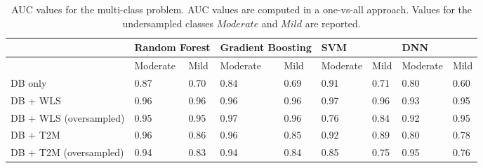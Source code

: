 \documentclass{article}
\begin{document}
\begin{table}[h]
\centering
\caption{AUC values for the multi-class problem. AUC values are computed in a one-vs-all approach. Values for the undersampled classes $Moderate$ and $Mild$ are reported.}
\label{aucmulti}
\begin{tabular}{|p{2cm}||p{1cm}p{1cm}|p{1cm}p{1cm}|p{1cm}p{1cm}|p{1cm}p{1cm}|}
\hline
                        & \multicolumn{2}{l|}{Random Forest} & \multicolumn{2}{l|}{Gradient Boosting} & \multicolumn{2}{l|}{SVM} & \multicolumn{2}{l|}{DNN} \\ \hline
                        & Moderate           & Mild          & Moderate             & Mild            & Moderate      & Mild     & Moderate      & Mild     \\ \hline
DB only                 & 0.87               & 0.70          & 0.84                 & 0.69            &               0.91 & 0.71         & 0.80          & 0.60     \\ \hline
DB + WLS                & 0.96               & 0.96          & 0.96                 & 0.96            &  0.97             & 0.96         & 0.93          & 0.95     \\ \hline
DB +  WLS \newline (oversampled) & 0.95               & 0.95          & 0.97                 & 0.96            &     0.76          & 0.84         & 0.92          & 0.95     \\ \hline
DB +  T2M               & 0.96               & 0.86          & 0.96                 & 0.85            &    0.92           &      0.89    & 0.80          & 0.78     \\ \hline
DB + T2M \newline (oversampled)  & 0.94               & 0.83          & 0.94                 & 0.84            &   0.85            & 0.75         & 0.95          & 0.76     \\ \hline
\end{tabular}
\end{table}
\end{document}

